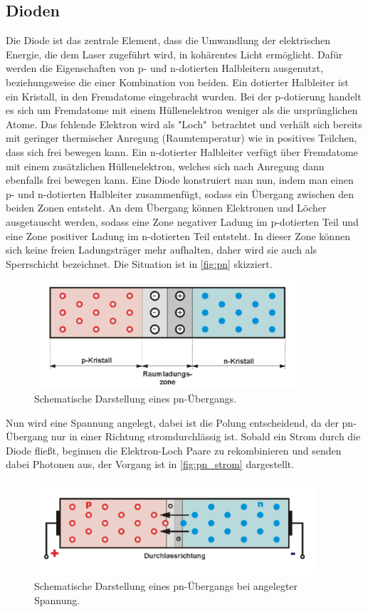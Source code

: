 \subsection{Dioden}
\label{sec:sub2}
Die Diode ist das zentrale Element, dass die Umwandlung der elektrischen Energie, die dem Laser zugeführt wird, in
kohärentes Licht ermöglicht.
Dafür werden die Eigenschaften von p- und n-dotierten Halbleitern ausgenutzt, beziehungsweise die einer Kombination von beiden.
Ein dotierter Halbleiter ist ein Kristall, in den Fremdatome eingebracht wurden. Bei der p-dotierung handelt es sich um
Fremdatome mit einem Hüllenelektron weniger als die ursprünglichen Atome. Das fehlende Elektron wird als "Loch"\, betrachtet
und verhält sich bereits mit geringer thermischer Anregung (Raumtemperatur) wie in positives Teilchen, dass sich frei bewegen kann.
Ein n-dotierter Halbleiter verfügt über Fremdatome mit einem zusätzlichen Hüllenelektron, welches sich nach Anregung dann ebenfalls frei
bewegen kann.
Eine Diode konstruiert man nun, indem man einen p- und n-dotierten Halbleiter zusammenfügt, sodass ein Übergang zwischen den
beiden Zonen entsteht. An dem Übergang können Elektronen und Löcher ausgetauscht werden, sodass eine Zone negativer Ladung
im p-dotierten Teil und eine Zone positiver Ladung im n-dotierten Teil entsteht.
In dieser Zone können sich keine freien Ladungsträger mehr aufhalten, daher wird sie auch als Sperrschicht bezeichnet.
Die Situation ist in \autoref{fig:pn} skizziert.
\begin{figure}[H]
    \centering
    \includegraphics[height=4cm]{content/pics/pn_uebergang.png}
    \caption{Schematische Darstellung eines pn-Übergangs. \cite{pn_uebergang}}
    \label{fig:pn}
\end{figure}
Nun wird eine Spannung angelegt, dabei ist die Polung entscheidend, da der pn-Übergang nur in einer Richtung stromdurchlässig ist.
Sobald ein Strom durch die Diode fließt, beginnen die Elektron-Loch Paare zu rekombinieren und senden dabei Photonen aus, der
Vorgang ist in \autoref{fig:pn_strom} dargestellt.
\begin{figure}[H]
    \centering
    \includegraphics[height=3.5cm]{content/pics/pn_strom.png}
    \caption{Schematische Darstellung eines pn-Übergangs bei angelegter Spannung. \cite{pn_uebergang}}
    \label{fig:pn_strom}
\end{figure}
